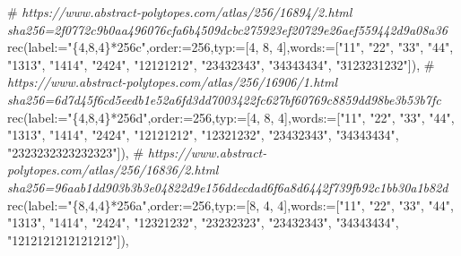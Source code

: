 \documentclass[
  10pt,
  letterpaper,
]{article}
\newenvironment{Shaded}{}{}
\newcommand{\CommentTok}[1]{\textcolor[rgb]{0.38,0.63,0.69}{\textit{#1}}}
\newcommand{\ExtensionTok}[1]{#1}
\newcommand{\FloatTok}[1]{\textcolor[rgb]{0.25,0.63,0.44}{#1}}
\newcommand{\NormalTok}[1]{#1}
\newcommand{\OperatorTok}[1]{\textcolor[rgb]{0.40,0.40,0.40}{#1}}
\newcommand{\StringTok}[1]{\textcolor[rgb]{0.25,0.44,0.63}{#1}}
\newcommand{\VariableTok}[1]{\textcolor[rgb]{0.10,0.09,0.49}{#1}}
\begin{document}
\begin{Shaded}
\begin{Highlighting}[]
\NormalTok{\#}\CommentTok{ https://www.abstract{-}polytopes.com/atlas/256/16894/2.html sha256=2f0772c9b0aa496076cfa6b4509dcbc275923ef20729e26aef559442d9a08a36}
\ExtensionTok{rec}\NormalTok{(}\VariableTok{label}\OperatorTok{:=}\StringTok{"\{4,8,4\}*256c"}\OperatorTok{,}\VariableTok{order}\OperatorTok{:=}\FloatTok{256}\OperatorTok{,}\VariableTok{typ}\OperatorTok{:=}\NormalTok{[}\FloatTok{4}\OperatorTok{,} \FloatTok{8}\OperatorTok{,} \FloatTok{4}\NormalTok{]}\OperatorTok{,}\VariableTok{words}\OperatorTok{:=}\NormalTok{[}\StringTok{"11"}\OperatorTok{,} \StringTok{"22"}\OperatorTok{,} \StringTok{"33"}\OperatorTok{,} \StringTok{"44"}\OperatorTok{,} \StringTok{"1313"}\OperatorTok{,} \StringTok{"1414"}\OperatorTok{,} \StringTok{"2424"}\OperatorTok{,} \StringTok{"12121212"}\OperatorTok{,} \StringTok{"23432343"}\OperatorTok{,} \StringTok{"34343434"}\OperatorTok{,} \StringTok{"3123231232"}\NormalTok{])}\OperatorTok{,}
\NormalTok{\#}\CommentTok{ https://www.abstract{-}polytopes.com/atlas/256/16906/1.html sha256=6d7d45f6cd5eedb1e52a6fd3dd7003422fc627bf60769c8859dd98be3b53b7fc}
\ExtensionTok{rec}\NormalTok{(}\VariableTok{label}\OperatorTok{:=}\StringTok{"\{4,8,4\}*256d"}\OperatorTok{,}\VariableTok{order}\OperatorTok{:=}\FloatTok{256}\OperatorTok{,}\VariableTok{typ}\OperatorTok{:=}\NormalTok{[}\FloatTok{4}\OperatorTok{,} \FloatTok{8}\OperatorTok{,} \FloatTok{4}\NormalTok{]}\OperatorTok{,}\VariableTok{words}\OperatorTok{:=}\NormalTok{[}\StringTok{"11"}\OperatorTok{,} \StringTok{"22"}\OperatorTok{,} \StringTok{"33"}\OperatorTok{,} \StringTok{"44"}\OperatorTok{,} \StringTok{"1313"}\OperatorTok{,} \StringTok{"1414"}\OperatorTok{,} \StringTok{"2424"}\OperatorTok{,} \StringTok{"12121212"}\OperatorTok{,} \StringTok{"12321232"}\OperatorTok{,} \StringTok{"23432343"}\OperatorTok{,} \StringTok{"34343434"}\OperatorTok{,} \StringTok{"2323232323232323"}\NormalTok{])}\OperatorTok{,}
\NormalTok{\#}\CommentTok{ https://www.abstract{-}polytopes.com/atlas/256/16836/2.html sha256=96aab1dd903b3b3e04822d9e156ddecdad6f6a8d6442f739fb92c1bb30a1b82d}
\ExtensionTok{rec}\NormalTok{(}\VariableTok{label}\OperatorTok{:=}\StringTok{"\{8,4,4\}*256a"}\OperatorTok{,}\VariableTok{order}\OperatorTok{:=}\FloatTok{256}\OperatorTok{,}\VariableTok{typ}\OperatorTok{:=}\NormalTok{[}\FloatTok{8}\OperatorTok{,} \FloatTok{4}\OperatorTok{,} \FloatTok{4}\NormalTok{]}\OperatorTok{,}\VariableTok{words}\OperatorTok{:=}\NormalTok{[}\StringTok{"11"}\OperatorTok{,} \StringTok{"22"}\OperatorTok{,} \StringTok{"33"}\OperatorTok{,} \StringTok{"44"}\OperatorTok{,} \StringTok{"1313"}\OperatorTok{,} \StringTok{"1414"}\OperatorTok{,} \StringTok{"2424"}\OperatorTok{,} \StringTok{"12321232"}\OperatorTok{,} \StringTok{"23232323"}\OperatorTok{,} \StringTok{"23432343"}\OperatorTok{,} \StringTok{"34343434"}\OperatorTok{,} \StringTok{"1212121212121212"}\NormalTok{])}\OperatorTok{,}

\end{Highlighting}
\end{Shaded}
\end{document}
